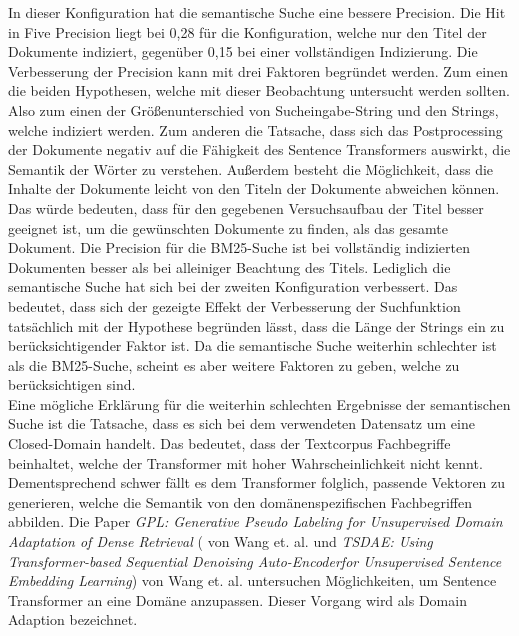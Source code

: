 In dieser Konfiguration hat die semantische Suche eine bessere Precision.
Die Hit in Five Precision liegt bei 0,28 für die Konfiguration, welche nur den Titel der Dokumente indiziert, gegenüber 0,15 bei einer vollständigen Indizierung.
Die Verbesserung der Precision kann mit drei Faktoren begründet werden.
Zum einen die beiden Hypothesen, welche mit dieser Beobachtung untersucht werden sollten.
Also zum einen der Größenunterschied von Sucheingabe-String und den Strings, welche indiziert werden.
Zum anderen die Tatsache, dass sich das Postprocessing der Dokumente negativ auf die Fähigkeit des Sentence Transformers auswirkt, die Semantik der Wörter zu verstehen.
Außerdem besteht die Möglichkeit, dass die Inhalte der Dokumente leicht von den Titeln der Dokumente abweichen können.
Das würde bedeuten, dass für den gegebenen Versuchsaufbau der Titel besser geeignet ist, um die gewünschten Dokumente zu finden, als das gesamte Dokument.
Die Precision für die BM25-Suche ist bei vollständig indizierten Dokumenten besser als bei alleiniger Beachtung des Titels.
Lediglich die semantische Suche hat sich bei der zweiten Konfiguration verbessert.
Das bedeutet, dass sich der gezeigte Effekt der Verbesserung der Suchfunktion tatsächlich mit der Hypothese begründen lässt, dass die Länge der Strings ein zu berücksichtigender Faktor ist.
Da die semantische Suche weiterhin schlechter ist als die BM25-Suche, scheint es aber weitere Faktoren zu geben, welche zu berücksichtigen sind.\\


Eine mögliche Erklärung für die weiterhin schlechten Ergebnisse der semantischen Suche ist die Tatsache, dass es sich bei dem verwendeten Datensatz um eine Closed-Domain handelt.
Das bedeutet, dass der Textcorpus Fachbegriffe beinhaltet, welche der Transformer mit hoher Wahrscheinlichkeit nicht kennt.
Dementsprechend schwer fällt es dem Transformer folglich, passende Vektoren zu generieren, welche die Semantik von den domänenspezifischen Fachbegriffen abbilden.
Die Paper \textit{GPL: Generative Pseudo Labeling for Unsupervised Domain Adaptation of Dense Retrieval} (\cite{Wang_Thakur_Reimers_Gurevych_2022} von Wang et. al. und \textit{TSDAE: Using Transformer-based Sequential Denoising Auto-Encoderfor Unsupervised Sentence Embedding Learning}\cite{Wang_Reimers_Gurevych_2021}) von Wang et. al. untersuchen Möglichkeiten, um Sentence Transformer an eine Domäne anzupassen.
Dieser Vorgang wird als Domain Adaption bezeichnet.


